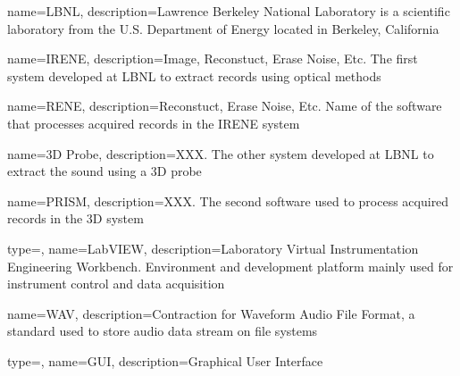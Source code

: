%

{
    name=LBNL,
    description={Lawrence Berkeley National Laboratory is a scientific laboratory from the U.S. Department of Energy located in Berkeley, California}
}

{
    name=IRENE,
    description={Image, Reconstuct, Erase Noise, Etc. The first system developed at LBNL to extract records using optical methods}
}

{
    name=RENE,
    description={Reconstuct, Erase Noise, Etc. Name of the software that processes acquired records in the IRENE system} %
}

{
    name=3D Probe,
    description={XXX. The other system developed at LBNL to extract the sound using a 3D probe}
}

{
    name=PRISM,
    description={XXX. The second software used to process acquired records in the 3D system}
}

{
    type=\acronymtype,
    name={LabVIEW},
    description={Laboratory Virtual Instrumentation Engineering Workbench. Environment and development platform mainly used for instrument control and data acquisition}
}

{
    name={WAV},
    description={Contraction for Waveform Audio File Format, a standard used to store audio data stream on file systems}
}

{
    type=\acronymtype,
    name={GUI},
    description={Graphical User Interface}
}

